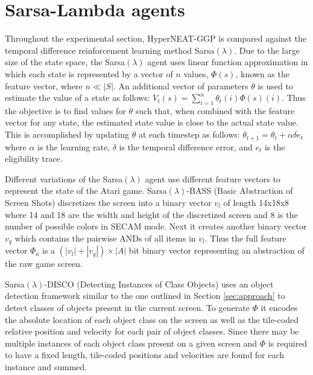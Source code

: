\documentclass{sig-alternate}
\begin{document}
\section{Sarsa-Lambda agents}
\label{sec:sarsa}
Throughout the experimental section, HyperNEAT-GGP is compared against the temporal difference reinforcement learning method Sarsa$(\lambda)$. Due to the large size of the state space, the Sarsa$(\lambda)$ agent uses linear function approximation in which each state is represented by a vector of $n$ values, $\Phi(s)$, known as the feature vector, where $n \ll |S|$. An additional vector of parameters $\theta$ is used to estimate the value of a state as follows: $V_t(s) = \sum_{i=1}^n \theta_t(i) \Phi(s) (i)$. Thus the objective is to find values for $\theta$ such that, when combined with the feature vector for any state, the estimated state value is close to the actual state value. This is accomplished by updating $\theta$ at each timestep as follows: $\theta_{t+1} = \theta_t + \alpha \delta e_t$ where $\alpha$ is the learning rate, $\delta$ is the temporal difference error, and $e_t$ is the eligibility trace. 

Different variations of the Sarsa$(\lambda)$ agent use different feature vectors to represent the state of the Atari game. Sarsa$(\lambda)$-BASS (Basic Abstraction of Screen Shots) discretizes the screen into a binary vector $v_l$ of length 14x18x8 where 14 and 18 are the width and height of the discretized screen and 8 is the number of possible colors in SECAM mode. Next it creates another binary vector $v_q$ which contains the pairwise ANDs of all items in $v_l$.  Thus the full feature vector $\Phi_a$ is a $(|v_l| + |v_q|) \times |A|$ bit binary vector representing an abstraction of the raw game screen. 

Sarsa$(\lambda)$-DISCO (Detecting Instances of Class Objects) uses an object detection framework similar to the one outlined in Section \ref{sec:approach} to detect classes of objects present in the current screen. To generate $\Phi$ it encodes the absolute location of each object class on the screen as well as the tile-coded relative position and velocity for each pair of object classes. Since there may be multiple instances of each object class present on a given screen and $\Phi$ is required to have a fixed length, tile-coded positions and velocities are found for each instance and summed. 
\end{document}
